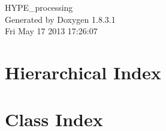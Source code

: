 \documentclass{book}
\begin{document}
\hypersetup{pageanchor=false,citecolor=blue}
\begin{titlepage}
\vspace*{7cm}
\begin{center}
{\Large H\-Y\-P\-E\-\_\-processing }\\
\vspace*{1cm}
{\large Generated by Doxygen 1.8.3.1}\\
\vspace*{0.5cm}
{\small Fri May 17 2013 17:26:07}\\
\end{center}
\end{titlepage}
\clearemptydoublepage
{}
\tableofcontents
\clearemptydoublepage
{}
\hypersetup{pageanchor=true,citecolor=blue}
\chapter{Hierarchical Index}

\chapter{Class Index}

\end{document}
